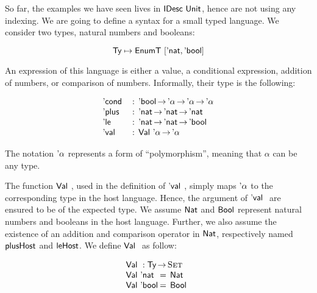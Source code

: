 \newcommand{\Val}[1]{\D{Val}~#1}
\newcommand{\Var}[2]{\D{Var}_{#1}~#2}

\newcommand{\HExprD}{\C{ExprD}}
\newcommand{\HExprAD}{\C{ExprAlwaysD}}
\newcommand{\HExprID}{\C{ExprIndexedD}}
\newcommand{\HExprVarD}[1]{\C{ExprD}_{\C{Var},#1}}
\newcommand{\HExprFreeD}{\C{ExprD}^{\C{Free}}}
\newcommand{\HExprAFreeD}{\C{ExprAlwaysD}^{\C{Free}}}

So far, the examples we have seen lives in $\IDesc{\Unit}$, hence are
not using any indexing. We are going to define a syntax for a small
typed language. We consider two types, natural numbers and booleans:

\[
\Ty \mapsto \EnumT{[\Enat, \Ebool]}
\]

An expression of this language is either a value, a conditional
expression, addition of numbers, or comparison of numbers. Informally,
their type is the following:

\[
\begin{array}{l@{\::\:\:}l}
\Econd{}{}{}     & \Ebool \To \Epolym \To \Epolym \To \Epolym  \\ 
\Eplus{}{}       & \Enat \To \Enat \To \Enat                   \\
\Ele{}{}         & \Enat \To \Enat \To \Ebool                  \\
\Eval{}          & \Val{\Epolym} \To \Epolym
\end{array}
\]

The notation $\Epolym$ represents a form of ``polymorphism'', meaning
that $\alpha$ can be any type. 

The function $\Val{}$, used in the definition of $\Eval{}$, simply
maps $\Epolym$ to the corresponding type in the host language. Hence,
the argument of $\Eval{}$ are ensured to be of the expected type. We
assume $\Nat$ and $\Bool$ represent natural numbers and booleans in
the host language. Further, we also assume the existence of an
addition and comparison operator in $\Nat$, respectively named
$\F{plusHost}$ and $\F{leHost}$. We define $\Val{}$ as follow:

\[\stk{
\Val{} : \Ty \To \Set \\
\begin{array}{@{}l@{\:=\:\:}l}
\Val{\Enat}   & \Nat \\
\Val{\Ebool}  & \Bool
\end{array}
}\]

